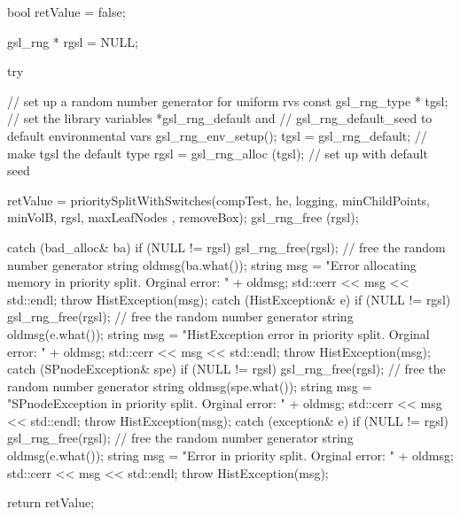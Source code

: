 \begin{DoxyCode}
{
    bool retValue = false;

    gsl_rng * rgsl = NULL;

    try {
        // set up a random number generator for uniform rvs
        const gsl_rng_type * tgsl;
        // set the library variables *gsl_rng_default and
        // gsl_rng_default_seed to default environmental vars
        gsl_rng_env_setup();
        tgsl = gsl_rng_default; // make tgsl the default type
        rgsl = gsl_rng_alloc (tgsl); // set up with default seed

        retValue = prioritySplitWithSwitches(compTest, he, logging,
                                    minChildPoints, minVolB, rgsl, maxLeafNodes
      ,
                        removeBox);
        gsl_rng_free (rgsl);
    }

    catch (bad_alloc& ba) {
        if (NULL != rgsl) gsl_rng_free(rgsl); // free the random number
       generator
        string oldmsg(ba.what());
        string msg = "Error allocating memory in priority split.  Orginal
       error: "
                                     + oldmsg;
        std::cerr << msg << std::endl;
        throw HistException(msg);
    }
    catch (HistException& e) {
        if (NULL != rgsl) gsl_rng_free(rgsl); // free the random number
       generator
        string oldmsg(e.what());
        string msg = "HistException error in priority split.  Orginal error: "
                                    + oldmsg;
        std::cerr << msg << std::endl;
        throw HistException(msg);
    }
    catch (SPnodeException& spe) {
        if (NULL != rgsl) gsl_rng_free(rgsl); // free the random number
       generator
        string oldmsg(spe.what());
        string msg = "SPnodeException in priority split.  Orginal error: "
                                    + oldmsg;
        std::cerr << msg << std::endl;
        throw HistException(msg);
    }
    catch (exception& e) {
        if (NULL != rgsl) gsl_rng_free(rgsl); // free the random number
       generator
        string oldmsg(e.what());
        string msg = "Error in priority split.  Orginal error: " + oldmsg;
        std::cerr << msg << std::endl;
        throw HistException(msg);
    }

    return retValue;
}
\end{DoxyCode}
